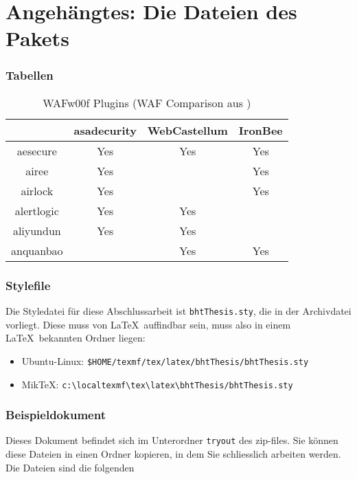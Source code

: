 

\chapter{Angehängtes: Die Dateien des Pakets}

\subsection*{Tabellen}

\begin{table}[h]
    \centering
    \begin{tabular}{|c | c | c | c |} 
 \hline
  & \textbf{asadecurity} & \textbf{WebCastellum} & \textbf{IronBee} \\ [0.5ex] 
 \hline
 aesecure & Yes & Yes & Yes \\ 
 \hline
 airee & Yes &  & Yes \\
 \hline
 airlock & Yes &  & Yes \\
 \hline
 alertlogic & Yes & Yes &  \\
 \hline
 aliyundun & Yes & Yes &  \\ [1ex] 
 \hline
 anquanbao & & Yes & Yes \\
 \hline
\end{tabular}
    \caption{WAFw00f Plugins (WAF Comparison aus \cite{sampaio_evaluation_2017}) }
    \label{tab:my_label}
\end{table}


\subsection*{Stylefile}
Die  Styledatei für diese  Abschlussarbeit ist  \texttt{bhtThesis.sty}, die  in der
Archivdatei vorliegt.  Diese muss von \LaTeX\  auffindbar sein, muss  also in einem
\LaTeX\ bekannten Ordner liegen:
\begin{itemize}
\item Ubuntu-Linux: \verb|$HOME/texmf/tex/latex/bhtThesis/bhtThesis.sty|
\item MikTeX: \verb|c:\localtexmf\tex\latex\bhtThesis/bhtThesis.sty|
\end{itemize}


\subsection*{Beispieldokument}
Dieses  Dokument befindet sich  im Unterordner  \texttt{tryout} des  zip-files. Sie
können diese  Dateien in  einen Ordner kopieren,  in dem Sie  schliesslich arbeiten
werden. Die Dateien sind die folgenden

